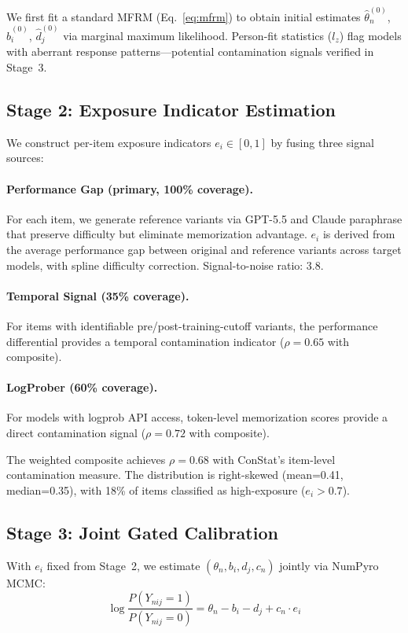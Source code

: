 \documentclass[11pt,twocolumn]{article}
\newcommand{\thetahat}{\hat{\theta}}
\begin{document}
We first fit a standard MFRM (Eq.~\ref{eq:mfrm}) to obtain initial estimates $\thetahat^{(0)}_n$, $\hat{b}^{(0)}_i$, $\hat{d}^{(0)}_j$ via marginal maximum likelihood. Person-fit statistics ($l_z$) flag models with aberrant response patterns---potential contamination signals verified in Stage~3.

\subsection{Stage 2: Exposure Indicator Estimation}

We construct per-item exposure indicators $e_i \in [0,1]$ by fusing three signal sources:

\paragraph{Performance Gap (primary, 100\% coverage).} For each item, we generate reference variants via GPT-5.5 and Claude paraphrase that preserve difficulty but eliminate memorization advantage. $e_i$ is derived from the average performance gap between original and reference variants across target models, with spline difficulty correction. Signal-to-noise ratio: 3.8.

\paragraph{Temporal Signal (35\% coverage).} For items with identifiable pre/post-training-cutoff variants, the performance differential provides a temporal contamination indicator ($\rho=0.65$ with composite).

\paragraph{LogProber (60\% coverage).} For models with logprob API access, token-level memorization scores provide a direct contamination signal ($\rho=0.72$ with composite).

The weighted composite achieves $\rho=0.68$ with ConStat's item-level contamination measure. The distribution is right-skewed (mean=0.41, median=0.35), with 18\% of items classified as high-exposure ($e_i > 0.7$).

\subsection{Stage 3: Joint Gated Calibration}

With $e_i$ fixed from Stage~2, we estimate $(\theta_n, b_i, d_j, c_n)$ jointly via NumPyro MCMC:
\begin{equation}
\log \frac{P(Y_{nij}=1)}{P(Y_{nij}=0)} = \theta_n - b_i - d_j + c_n \cdot e_i
\end{equation}
\end{document}
